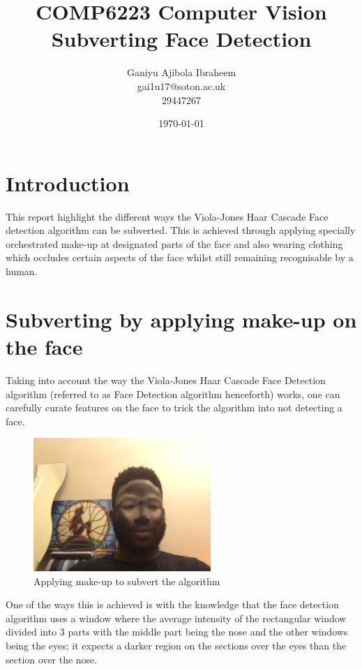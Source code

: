 \documentclass[a4paper,12pt]{article}
\begin{document}
	
\begin{titlepage}
	\title{
		COMP6223 Computer Vision \\
		\large Subverting Face Detection
	}
	\date{\today}
	\author{
		Ganiyu Ajibola Ibraheem \\
		\large gai1u17@soton.ac.uk \\
			29447267
	}
\end{titlepage}

\maketitle
\newpage
{}
\tableofcontents
\listoffigures
\newpage
{}


\section{Introduction}
This report highlight the different ways the Viola-Jones Haar Cascade Face detection algorithm can be subverted. This is achieved through applying specially orchestrated make-up at designated parts of the face and also wearing clothing which occludes certain aspects of the face whilst still remaining recognisable by a human.

\section{Subverting by applying make-up on the face}
Taking into account the way the Viola-Jones Haar Cascade Face Detection algorithm (referred to as Face Detection algorithm henceforth) works, one can carefully curate features on the face to trick the algorithm into not detecting a face. \\
	\begin{figure} 
		\centering
		\includegraphics[width=0.6\textwidth]{images/make_up}
		\caption{Applying make-up to subvert the algorithm}
		\label{fig:make_up}
	\end{figure}
One of the ways this is achieved is with the knowledge that the face detection algorithm uses a window where the average intensity of the rectangular window divided into 3 parts with the middle part being the nose and the other windows being the eyes; it expects a darker region on the sections over the eyes than the section over the nose. \\
	
\end{document}
